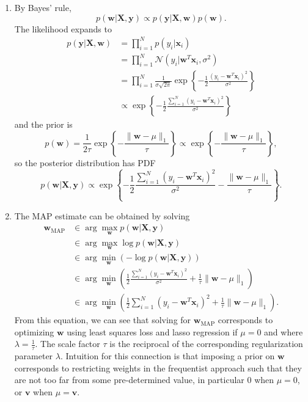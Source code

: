 \documentclass[submit]{harvardml}
\begin{document}
\begin{enumerate}
	\item By Bayes' rule,
	$$p(\mathbf{w}|\mathbf{X}, \mathbf{y}) \propto p(\mathbf{y}|\mathbf{X}, \mathbf{w}) p(\mathbf{w}).$$
	The likelihood expands to
	\begin{align*}
		p(\mathbf{y}|\mathbf{X}, \mathbf{w}) &= \prod_{i=1}^N p(y_i | \mathbf{x}_i) \\
		&= \prod_{i=1}^N \mathcal{N}(y_i | \mathbf{w}^T\mathbf{x}_i, \sigma^2) \\
		&= \prod_{i=1}^N \frac{1}{\sigma\sqrt{2\pi}} \exp\left\{-\frac12 \frac{(y_i - \mathbf{w}^T\mathbf{x}_i)^2}{\sigma^2}\right\} \\
		&\propto \exp\left\{-\frac12 \frac{\sum_{i=1}^N(y_i - \mathbf{w}^T\mathbf{x}_i)^2}{\sigma^2}\right\}
	\end{align*}
	and the prior is
	$$p(\mathbf{w}) = \frac{1}{2\tau} \exp\left\{-\frac{\|\mathbf{w} - \mu\|_1}{\tau}\right\}
		\propto \exp\left\{-\frac{\|\mathbf{w} - \mu\|_1}{\tau}\right\},$$
	so the posterior distribution has PDF
	$$p(\mathbf{w}|\mathbf{X}, \mathbf{y}) \propto \exp\left\{-\frac12 \frac{\sum_{i=1}^N(y_i - \mathbf{w}^T\mathbf{x}_i)^2}{\sigma^2} -\frac{\|\mathbf{w} - \mu\|_1}{\tau}\right\}.$$
	
	\item The MAP estimate can be obtained by solving
	\begin{align*}
		\mathbf{w}_{\mathrm{MAP}} &\in \arg \max_{\mathbf{w}} p(\mathbf{w}|\mathbf{X}, \mathbf{y}) \\
		&\in \arg \max_{\mathbf{w}} \log p(\mathbf{w}|\mathbf{X}, \mathbf{y}) \\
		&\in \arg \min_{\mathbf{w}} (-\log p(\mathbf{w}|\mathbf{X}, \mathbf{y})) \\
		&\in \arg \min_{\mathbf{w}} \left(\frac12 \frac{\sum_{i=1}^N(y_i - \mathbf{w}^T\mathbf{x}_i)^2}{\sigma^2} +\frac{1}{\tau}\|\mathbf{w} - \mu\|_1\right) \\
		&\in \arg \min_{\mathbf{w}} \left(\frac12 \sum_{i=1}^N(y_i - \mathbf{w}^T\mathbf{x}_i)^2 +\frac{1}{\tau}\|\mathbf{w} - \mu\|_1\right).
	\end{align*}
	From this equation, we can see that solving for $\mathbf{w}_{\mathrm{MAP}}$ corresponds to optimizing $\mathbf{w}$ using least squares loss and lasso regression if $\mu = 0$ and where $\lambda = \frac{1}{\tau}$. The scale factor $\tau$ is the reciprocal of the corresponding regularization parameter $\lambda$. Intuition for this connection is that imposing a prior on $\mathbf{w}$ corresponds to restricting weights in the frequentist approach such that they are not too far from some pre-determined value, in particular $0$ when $\mu = 0$, or $\mathbf{v}$ when $\mu = \mathbf{v}$.


\end{enumerate}
\end{document}
